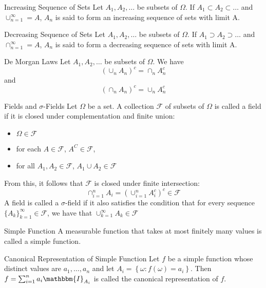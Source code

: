 \documentclass[avery5371,grid]{flashcards}
\begin{document}
\begin{flashcard}[Definition]{Increasing Sequence of Sets}
Let $A_1,A_2,\ldots$ be subsets of $\Omega$. If $A_1 \subset A_2 \subset \ldots$ and 
$\cup_{n=1}^\infty = A$, $A_n$ is said to form an increasing sequence of sets with limit A.
\end{flashcard}

\begin{flashcard}[Definition]{Decreasing Sequence of Sets}
Let $A_1,A_2,\ldots$ be subsets of $\Omega$. If $A_1 \supset A_2 \supset \ldots$ and 
$\cap_{n=1}^\infty = A$, $A_n$ is said to form a decreasing sequence of sets with limit A.
\end{flashcard}


\begin{flashcard}[Theorem]{De Morgan Laws}
Let $A_1,A_2,\ldots$ be subsets of $\Omega$. We have
\[
\left(\cup_n A_n\right)^c = \cap_n A_n^c 
\]
and
\[
\left( \cap_n A_n \right)^c = \cup_n A_n^c
\]
\end{flashcard}


\begin{flashcard}[Definition]{Fields and $\sigma$-Fields}
\scriptsize
Let $\Omega$ be a set. A collection $\mathcal{F}$ of subsets of $\Omega$ is called a 
field if it is closed under complementation and finite union:
\begin{itemize}
 \item $\Omega \in \mathcal{F}$
 \item for each $A \in \mathcal{F}$, $A^C \in \mathcal F$, 
 \item for all $A_1,A_2 \in \mathcal{F}$, $A_1 \cup A_2 \in \mathcal{F}$ 
\end{itemize}
From this, it follows that $\mathcal{F}$ is closed under finite intersection:
\[
\cap_{i=1}^n A_i = \left( \cup_{i=1}^n A_i^c \right)^c \in \mathcal{F}
\]
A field is called a $\sigma$-field if it also satisfies the condition that for every
sequence $\{A_k\}_{k=1}^\infty \in \mathcal F$, we have that  $\cup_{k=1}^\infty A_k \in \mathcal{F}$
\end{flashcard}

\begin{flashcard}[Definition]{Simple Function}
 A measurable function that takes at most finitely many values is called a simple
 function.
\end{flashcard}

\begin{flashcard}[Definition]{Canonical Representation of Simple Function}
Let $f$ be a simple function whose distinct values are $a_1, \ldots, a_n$ and let
$A_i = \left\{ \omega : f\left( \omega \right) = a_i \right\}$. Then 
$f = \sum_{i=1}^n a_i \mathbbm{I}_{A_i}$ is called the canonical representation of
$f$. 
\end{flashcard}
\end{document}
